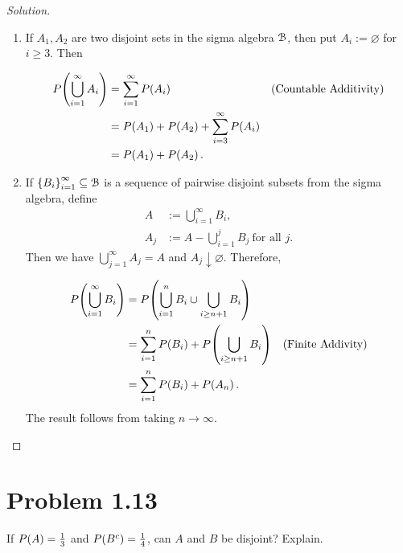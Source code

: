 \documentclass[12pt,letterpaper,reqno]{amsart}
\numberwithin{equation}{subsection}
\let\emptyset\varnothing
\begin{document}
\begin{proof}[Solution]~\\
\begin{enumerate}[label=(\alph*),leftmargin=*]
    \item If $A_1, A_2$ are two disjoint sets in the sigma algebra $\mathcal{{B}}$, then put $A_i := \emptyset$ for $i \geq 3$. Then
    
    \begin{align*}
        {P}\! \left( {\bigcup_{i = 1}^{\infty} A_i} \right) &= \sum_{i=1}^{\infty} {P}\! \left( {A_i} \right) & \left(\mbox{Countable Additivity} \right) \\
        &= {P}\! \left( {A_1} \right) + {P}\! \left( {A_2} \right) + \sum_{i=3}^{\infty} {P}\! \left( {A_i} \right) \\
        &= {P}\! \left( {A_1} \right) + {P}\! \left( {A_2} \right).
    \end{align*}
    
    \item If $\left\{ {B_i} \right\}_{i=1}^{\infty} \subseteq \mathcal{{B}}$ is a sequence of pairwise disjoint subsets from the sigma algebra, define
    \begin{align*}
        A &:= \bigcup_{i=1}^{\infty} B_i, \\
        A_j &:= A - \bigcup_{i=1}^j B_j \ \mbox{for all $j$}.
    \end{align*}
    Then we have $\bigcup_{j=1}^{\infty} A_j = A$ and $A_j \downarrow \emptyset$. Therefore,
    
    \begin{align*}
        {P}\! \left( {\bigcup_{i=1}^{\infty} B_i} \right) &= {P}\! \left( {\bigcup_{i=1}^n B_i \cup \bigcup_{i \geq n+1} B_i} \right) \\
                                            &= \sum_{i=1}^{n}{P}\! \left( {B_i} \right) + {P}\! \left( {\bigcup_{i \geq n + 1} B_i} \right) & \left( \mbox{Finite Addivity} \right) \\
                                            &= \sum_{i=1}^{n}{P}\! \left( {B_i} \right) + {P}\! \left( {A_n} \right).
    \end{align*}
    The result follows from taking $n \rightarrow \infty$.
\end{enumerate}
\end{proof}

\newpage
\section{Problem 1.13}

If ${P}\! \left( {A} \right) = \frac{1}{3}$ and ${P}\! \left( {B^c} \right) = \frac{1}{4}$, can $A$ and $B$ be disjoint? Explain.
\end{document}
